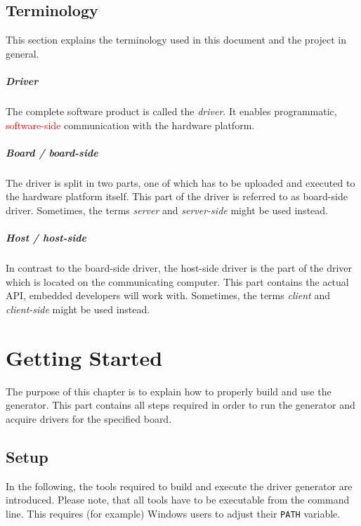 \documentclass{report}
\begin{document}
\section{Terminology}
\label{sec:term}
This section explains the terminology used in this document and the project in general.

\paragraph{Driver}
The complete software product is called the \textit{driver}. It enables programmatic, \textcolor{red}{software-side} communication with the hardware platform.

\paragraph{Board / board-side}
The driver is split in two parts, one of which has to be uploaded and executed to the hardware platform itself. This part of the driver is referred to as board-side driver. Sometimes, the terms \textit{server} and \textit{server-side} might be used instead.

\paragraph{Host / host-side}
In contrast to the board-side driver, the host-side driver is the part of the driver which is located on the communicating computer. This part contains the actual API, embedded developers will work with. Sometimes, the terms \textit{client} and \textit{client-side} might be used instead.



\chapter{Getting Started}
\label{sec:start}
The purpose of this chapter is to explain how to properly build and use the generator. This part contains all steps required in order to run the generator and acquire drivers for the specified board.

\section{Setup}
\label{sec:setup}
In the following, the tools required to build and execute the driver generator are introduced. Please note, that all tools have to be executable from the command line. This requires (for example) Windows users to adjust their \texttt{PATH} variable.
\end{document}
